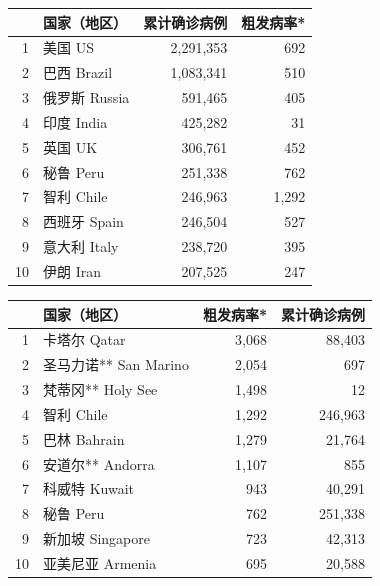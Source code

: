 \documentclass[]{article}
\begin{document}
\begin{table}[H]
    
    \begin{minipage}{.4\linewidth}
    \centering
    \captionsetup{justification=centering}
    \caption{累计确诊前十位国家}
      \vspace{-0.5\baselineskip}
      \centering
      \captionsetup{justification=centering} \begin{table}[H]
\centering
\begin{tabular}{rlrr}
\toprule
  & 国家（地区） & 累计确诊病例 & 粗发病率*\\
\midrule
\rowcolor{gray!6}  1 & 美国 US & 2,291,353 & 692\\
2 & 巴西 Brazil & 1,083,341 & 510\\
\rowcolor{gray!6}  3 & 俄罗斯 Russia & 591,465 & 405\\
4 & 印度 India & 425,282 & 31\\
\rowcolor{gray!6}  5 & 英国 UK & 306,761 & 452\\
6 & 秘鲁 Peru & 251,338 & 762\\
\rowcolor{gray!6}  7 & 智利 Chile & 246,963 & 1,292\\
8 & 西班牙 Spain & 246,504 & 527\\
\rowcolor{gray!6}  9 & 意大利 Italy & 238,720 & 395\\
10 & 伊朗 Iran & 207,525 & 247\\
\bottomrule
\end{tabular}
\end{table} \end{minipage}
    \begin{minipage}{.7\linewidth}
    \centering
    \captionsetup{justification=centering}
     \caption{粗发病率前十位国家}
     \vspace{-0.5\baselineskip}
      \centering
    \captionsetup{justification=centering} \begin{table}[H]
\centering
\begin{tabular}{rlrr}
\toprule
  & 国家（地区） & 粗发病率* & 累计确诊病例\\
\midrule
\rowcolor{gray!6}  1 & 卡塔尔 Qatar & 3,068 & 88,403\\
2 & 圣马力诺** San Marino & 2,054 & 697\\
\rowcolor{gray!6}  3 & 梵蒂冈** Holy See & 1,498 & 12\\
4 & 智利 Chile & 1,292 & 246,963\\
\rowcolor{gray!6}  5 & 巴林 Bahrain & 1,279 & 21,764\\
6 & 安道尔** Andorra & 1,107 & 855\\
\rowcolor{gray!6}  7 & 科威特 Kuwait & 943 & 40,291\\
8 & 秘鲁 Peru & 762 & 251,338\\
\rowcolor{gray!6}  9 & 新加坡 Singapore & 723 & 42,313\\
10 & 亚美尼亚 Armenia & 695 & 20,588\\
\bottomrule
\end{tabular}
\end{table} \end{minipage}
    

\end{table}
\end{document}
